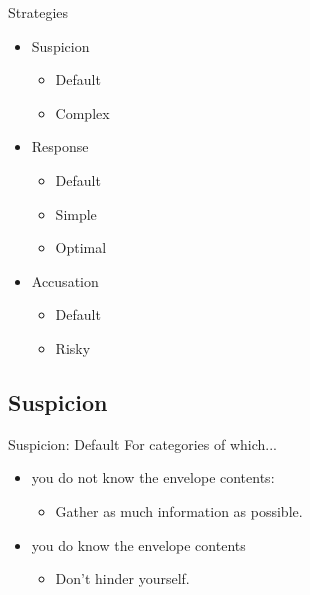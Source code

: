 
\begin{frame}{Strategies}
  \begin{itemize}
    \item Suspicion
    \begin{itemize}
     \item Default
     \item Complex
    \end{itemize}

    \item Response
    \begin{itemize}
     \item Default
     \item Simple
     \item Optimal
    \end{itemize}

    \item Accusation
    \begin{itemize}
     \item Default
     \item Risky
    \end{itemize}

  \end{itemize}
\end{frame}


\subsection{Suspicion}



\begin{frame}{Suspicion: Default}
  For categories of which...
  \begin{itemize}
   \item you do not know the envelope contents:
      \begin{itemize}
      \item Gather as much information as possible.
      \end{itemize}
   \item you do know the envelope contents
      \begin{itemize}
      \item Don't hinder yourself.
      \end{itemize}
  \end{itemize}

\end{frame}

